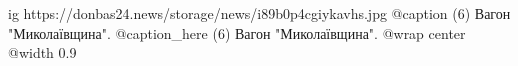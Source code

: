  
 
 
 
 

\ifcmt
  ig https://donbas24.news/storage/news/i89b0p4cgiykavhs.jpg
	@caption (6) Вагон "Миколаївщина".
	@caption_here (6) Вагон "Миколаївщина".
  @wrap center
  @width 0.9
\fi
